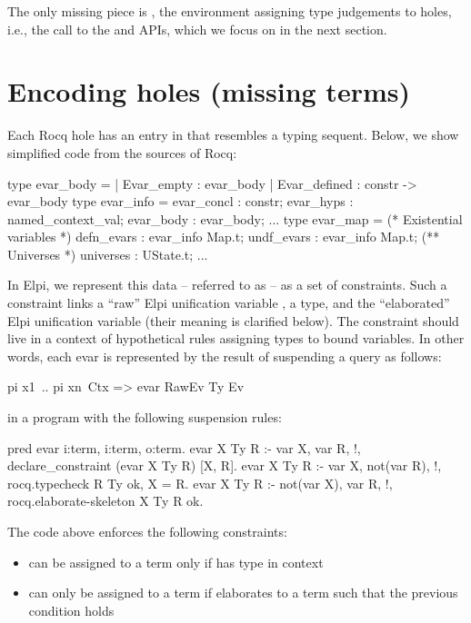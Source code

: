 \documentclass[a4paper, 11pt]{book}
\begin{document}
The only missing piece is , the environment assigning type
judgements to holes, i.e., the call to the  and
 APIs, which we focus on in the next section.

\section{Encoding holes (missing terms)}\label{sec:hoasholes}


Each Rocq hole has an entry in  that resembles a typing sequent.
Below, we show simplified code from the sources of Rocq:

\begin{ocamlcode}
type evar_body =
  | Evar_empty : evar_body
  | Evar_defined : constr -> evar_body
type evar_info = {
  evar_concl : constr;
  evar_hyps : named_context_val;
  evar_body : evar_body;
  ...
}
type evar_map = {
  (* Existential variables *)
  defn_evars : evar_info Map.t;
  undf_evars : evar_info Map.t;
  (** Universes *)
  universes  : UState.t;
  ...
}
\end{ocamlcode}

In Elpi, we represent this data -- referred to as  -- as a set of
 constraints. Such a constraint links a ``raw'' Elpi unification
variable , a type, and the ``elaborated'' Elpi unification variable
 (their meaning is clarified below).
The constraint should live in a context of hypothetical rules 
assigning types to bound variables. In other words, each evar is represented
by the result of suspending a query as follows:

\begin{elpicode}
  pi x1\ .. pi xn\ Ctx => evar RawEv Ty Ev
\end{elpicode}

\noindent in a program with the following suspension rules:

\begin{elpicode}
pred evar i:term, i:term, o:term. %
evar X Ty R :- var X, var R,      !, declare_constraint (evar X Ty R) [X, R].
evar X Ty R :- var X, not(var R), !, rocq.typecheck R Ty ok, X = R.
evar X Ty R :- not(var X), var R, !, rocq.elaborate-skeleton X Ty R ok.
\end{elpicode}

\noindent
The code above enforces the following constraints:

\begin{itemize}
  \item {} can be assigned to a term  only if
         has type  in context 
  \item {} can only be assigned to a term  if
         elaborates to a term  such that
        the previous condition holds
\end{itemize}
\end{document}
